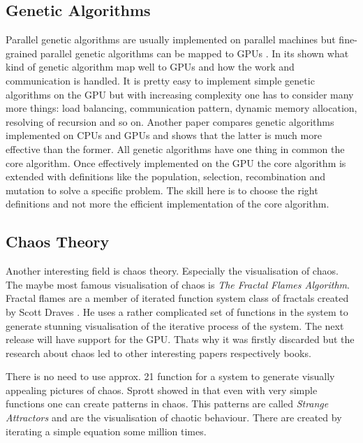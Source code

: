 \subsection{Genetic Algorithms} %
\label{par:genetic_algorithms}
Parallel genetic algorithms are usually implemented on parallel machines but
fine-grained parallel genetic algorithms can be mapped to \glspl{GPU}
\citep{citeulike:3801879}. In \citep{citeulike:3801866} its shown what kind of
genetic algorithm map well to \glspl{GPU} and how the work and communication is
handled. It is pretty easy to implement simple genetic algorithms on the
\gls{GPU} but with increasing complexity one has to consider many more things: load
balancing, communication pattern, dynamic memory allocation, resolving of
recursion and so on. Another paper \citep{citeulike:3801883} compares genetic
algorithms implemented on \glspl{CPU} and \glspl{GPU} and shows that the latter is much more
effective than the former. All genetic algorithms have one thing in common the
core algorithm. Once effectively implemented on the \gls{GPU} the core algorithm is
extended with definitions like the population, selection, recombination and
mutation to solve a specific problem. The skill here is to choose the right
definitions and not more the efficient implementation of the core algorithm. 

\subsection{Chaos Theory} %
\label{par:chaos_theory}
Another interesting field is chaos theory. Especially the visualisation of
chaos. The maybe most famous visualisation of chaos is \emph{The Fractal Flames
Algorithm}. Fractal flames are a member of iterated function system class of
fractals created by Scott Draves \citep{citeulike:3801950}. He uses a rather
complicated set of functions in the system to generate stunning visualisation of
the iterative process of the system. The next release will have support for the
\gls{GPU}. Thats why it was firstly discarded but the research about chaos led to
other interesting papers respectively books.

There is no need to use approx. 21 function for a system to generate visually
appealing pictures of chaos. Sprott showed in \citep{citeulike:3745535} that even
with very simple functions one can create patterns in chaos. This patterns are
called \emph{Strange Attractors} and are the visualisation of chaotic behaviour.
There are created by iterating a simple equation some million times. 

